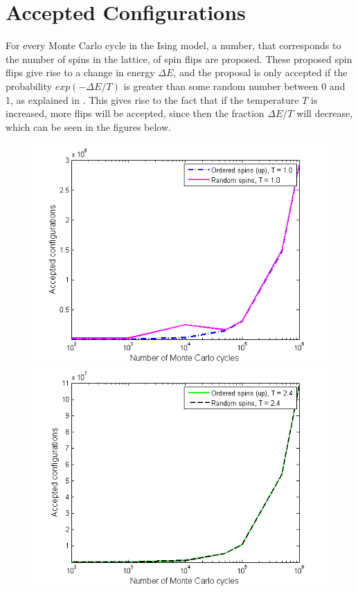 \section{Accepted Configurations}
\label{sec:AcceptedConfigurations}
For every Monte Carlo cycle in the Ising model, a number, that corresponds to the number of spins in the lattice, of spin flips are proposed. 
These proposed spin flips give rise to a change in energy $\Delta E$, and the proposal is only accepted if the probability $exp(-\Delta E /T)$ is greater than some random number between 0 and 1, as explained in . 
This gives rise to the fact that if the temperature $T$ is increased, more flips will be accepted, since then the fraction $\Delta E / T$ will decrease, which can be seen in the figures below.  
\begin{figure}[H]
\centering
\begin{minipage}{.5\textwidth}
  \centering
  \includegraphics[width=1\linewidth]{Figures/AcceptMC_ordered_random_spins_10.png}
\end{minipage}%
\begin{minipage}{.5\textwidth}
  \centering
  \includegraphics[width=1\linewidth]{Figures/AcceptMC_ordered_random_spins_24.png}

\end{minipage}
\end{figure}
